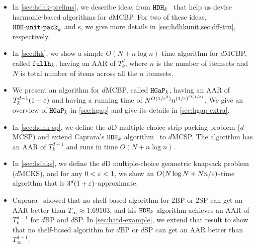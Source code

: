 \begin{itemize}
\item In \cref{sec:hdhk-prelims}, we describe ideas from $\operatorname{\mathtt{HDH}}_{k}$~\cite{caprara2008}
    that help us devise harmonic-based algorithms for $d$MCBP.
    For two of these ideas, $\operatorname{\mathtt{HDH-unit-pack}}_{k}$ and \dff{}s,
    we give more details in \cref{sec:hdhkunit,sec:dff-trn}, respectively.
\item In \cref{sec:fhk}, we show a simple $O(N + n\log n)$-time algorithm for $d$MCBP,
    called $\operatorname{\mathtt{fullh}}_{k}$, having an AAR of $T_k^d$, where $n$ is the number of itemsets
    and $N$ is total number of items across all the $n$ itemsets.
\item We present an algorithm for $d$MCBP, called $\operatorname{\mathtt{HGaP}}_{k}$, having an AAR of
    $T_k^{d-1}(1+\varepsilon)$ and having a running time of $N^{O(1/\varepsilon^2)}n^{(1/\varepsilon)^{O(1/\varepsilon)}}$.
    We give an overview of $\operatorname{\mathtt{HGaP}}_{k}$ in \cref{sec:hgap}
    and give its details in \cref{sec:hgap-extra}.
\item In \cref{sec:hdhk-sp}, we define the $d$D multiple-choice strip packing problem ($d$MCSP)
    and extend Caprara's $\operatorname{\mathtt{HDH}}_{k}$ algorithm~\cite{caprara2008} to $d$MCSP.
    The algorithm has an AAR of $T_k^{d-1}$ and runs in time $O(N + n\log n)$.
\item In \cref{sec:hdhks}, we define the $d$D multiple-choice geometric knapsack problem ($d$MCKS),
    and for any $0 < \varepsilon < 1$, we show an $O(N\log N + Nn/\varepsilon)$-time algorithm
    that is $3^d(1+\varepsilon)$-approximate.
\item Caprara~\cite{caprara2008} showed that no shelf-based algorithm for 2BP or 2SP
    can get an AAR better than $T_{\infty} \approx 1.69103$,
    and his $\operatorname{\mathtt{HDH}}_{k}$ algorithm achieves an AAR of $T_k^{d-1}$ for $d$BP and $d$SP.
    In \cref{sec:hard-example}, we extend that result to show that no shelf-based algorithm
    for $d$BP or $d$SP can get an AAR better than $T_{\infty}^{d-1}$.
\end{itemize}

